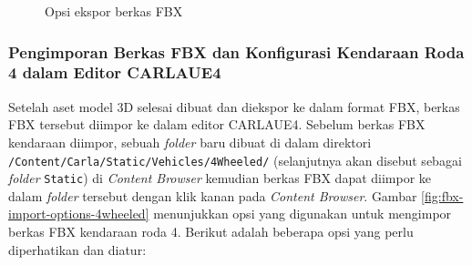 \begin{figure}[!h]
    \centering
    \hfill
    \caption{Opsi ekspor berkas FBX}
    \label{fig:export-fbx}
\end{figure}

\subsubsection{Pengimporan Berkas FBX dan Konfigurasi Kendaraan Roda 4 dalam Editor CARLAUE4}


Setelah aset model 3D selesai dibuat dan diekspor ke dalam format FBX, berkas
FBX tersebut diimpor ke dalam editor CARLAUE4. Sebelum berkas FBX kendaraan
diimpor, sebuah \textit{folder} baru dibuat di dalam direktori
\verb|/Content/Carla/Static/Vehicles/4Wheeled/| (selanjutnya akan disebut
sebagai \textit{folder} \verb|Static|) di \textit{Content Browser} kemudian
berkas FBX dapat diimpor ke dalam \textit{folder} tersebut dengan klik kanan
pada \textit{Content Browser}. Gambar \ref{fig:fbx-import-options-4wheeled}
menunjukkan opsi yang digunakan untuk mengimpor berkas FBX kendaraan roda 4.
Berikut adalah beberapa opsi yang perlu diperhatikan dan diatur:

